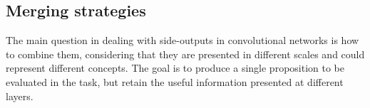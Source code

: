 \subsection{Merging strategies}

The main question in dealing with side-outputs in convolutional networks is how to combine them, considering that they are presented in different scales and could represent different concepts. The goal is to produce a single proposition to be evaluated in the task, but retain the useful information presented at different layers.

